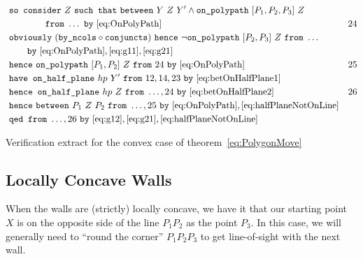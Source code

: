 \begin{boxedfigure}
\small
\begin{align*}
&\code{so consider}\ Z\ \code{such that}\ \between{Y}{Z}{Y'} \wedge \code{on\_polypath}\ [P_1,P_2,P_3]\ Z\\\
&\qquad\qquad\code{from}\ \ldots\ \code{by}\ \eqref{eq:OnPolyPath} & 24\\
&\code{obviously}\ (\code{by\_ncols}\circ\code{conjuncts})\ \code{hence}\ \neg\code{on\_polypath}\ [P_2,P_3]\ Z\ \code{from}\ \ldots\\
&\qquad\code{by}\ \eqref{eq:OnPolyPath},\eqref{eq:g11},\eqref{eq:g21}\\
&\code{hence}\ \code{on\_polypath}\ [P_1,P_2]\ Z\ \code{from}\ 24\ \code{by}\ \eqref{eq:OnPolyPath}&25\\
&\code{have on\_half\_plane}\ hp\ Y'\ \code{from}\ 12,14,23\ \code{by}\ \eqref{eq:betOnHalfPlane1}\\
&\code{hence on\_half\_plane}\ hp\ Z\ \code{from}\ \ldots,24\ \code{by}\ \eqref{eq:betOnHalfPlane2} & 26\\
&\code{hence}\ \between{P_1}{Z}{P_2}\ \code{from}\ \ldots,25\ \code{by}\ \eqref{eq:OnPolyPath},\eqref{eq:halfPlaneNotOnLine}\\
&\code{qed from}\ \ldots,26\ \code{by}\ \eqref{eq:g12},\eqref{eq:g21},\eqref{eq:halfPlaneNotOnLine}
\end{align*}
\caption{Verification extract for the convex case of theorem~\ref{eq:PolygonMove}}
\label{fig:ConvexVerification}
\end{boxedfigure}

\subsection{Locally Concave Walls}
When the walls are (strictly) locally concave, we have it that our starting point $X$ is on the opposite side of the line $P_1P_2$ as the point $P_3$. In this case, we will generally need to ``round the corner'' $P_1P_2P_3$ to get line-of-sight with the next wall. 

